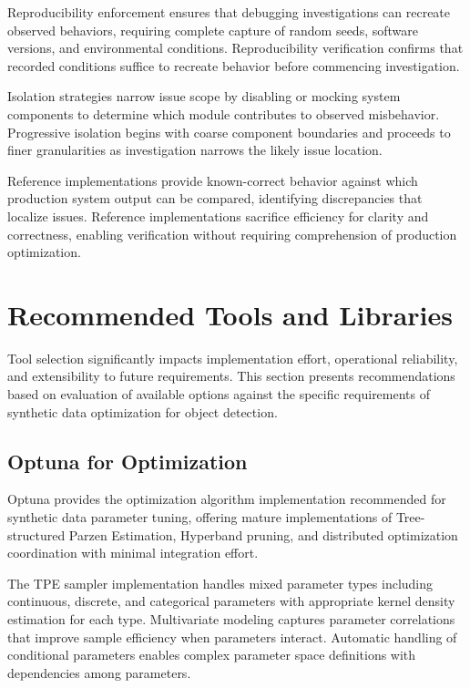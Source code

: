 Reproducibility enforcement ensures that debugging investigations can recreate observed behaviors, requiring complete capture of random seeds, software versions, and environmental conditions. Reproducibility verification confirms that recorded conditions suffice to recreate behavior before commencing investigation.

Isolation strategies narrow issue scope by disabling or mocking system components to determine which module contributes to observed misbehavior. Progressive isolation begins with coarse component boundaries and proceeds to finer granularities as investigation narrows the likely issue location.

Reference implementations provide known-correct behavior against which production system output can be compared, identifying discrepancies that localize issues. Reference implementations sacrifice efficiency for clarity and correctness, enabling verification without requiring comprehension of production optimization.

\section{Recommended Tools and Libraries}
\label{sec:recommended_tools}

Tool selection significantly impacts implementation effort, operational reliability, and extensibility to future requirements. This section presents recommendations based on evaluation of available options against the specific requirements of synthetic data optimization for object detection.

\subsection{Optuna for Optimization}

Optuna provides the optimization algorithm implementation recommended for synthetic data parameter tuning, offering mature implementations of Tree-structured Parzen Estimation, Hyperband pruning, and distributed optimization coordination with minimal integration effort.

The TPE sampler implementation handles mixed parameter types including continuous, discrete, and categorical parameters with appropriate kernel density estimation for each type. Multivariate modeling captures parameter correlations that improve sample efficiency when parameters interact. Automatic handling of conditional parameters enables complex parameter space definitions with dependencies among parameters.

